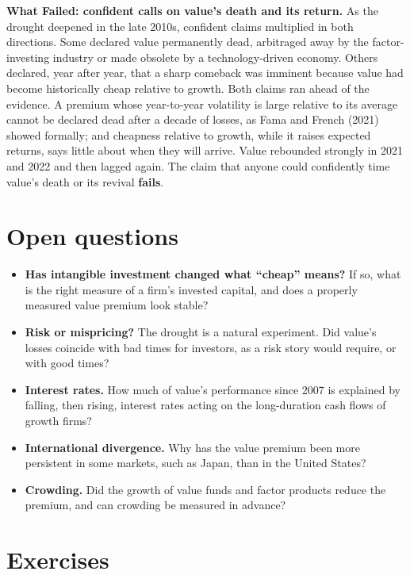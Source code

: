 \begin{callout}
\textbf{What Failed: confident calls on value's death and its return.} As the drought deepened in the late 2010s, confident claims multiplied in both directions. Some declared value permanently dead, arbitraged away by the factor-investing industry or made obsolete by a technology-driven economy. Others declared, year after year, that a sharp comeback was imminent because value had become historically cheap relative to growth. Both claims ran ahead of the evidence. A premium whose year-to-year volatility is large relative to its average cannot be declared dead after a decade of losses, as Fama and French (2021) showed formally; and cheapness relative to growth, while it raises expected returns, says little about when they will arrive. Value rebounded strongly in 2021 and 2022 and then lagged again. The claim that anyone could confidently time value's death or its revival \textbf{fails}.
\end{callout}

\section{Open questions}
\label{sec:08-open}

\begin{itemize}
  \item \textbf{Has intangible investment changed what ``cheap'' means?} If so, what is the right measure of a firm's invested capital, and does a properly measured value premium look stable?
  \item \textbf{Risk or mispricing?} The drought is a natural experiment. Did value's losses coincide with bad times for investors, as a risk story would require, or with good times?
  \item \textbf{Interest rates.} How much of value's performance since 2007 is explained by falling, then rising, interest rates acting on the long-duration cash flows of growth firms?
  \item \textbf{International divergence.} Why has the value premium been more persistent in some markets, such as Japan, than in the United States?
  \item \textbf{Crowding.} Did the growth of value funds and factor products reduce the premium, and can crowding be measured in advance?
\end{itemize}

\section*{Exercises}

